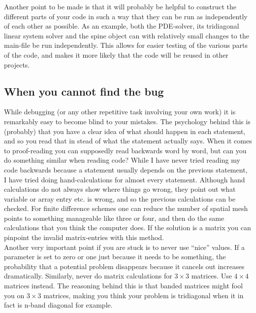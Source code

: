 Another point to be made is that it will probably be helpful to construct the different parts of your code in such a way that they can be run as independently of each other as possible. 
As an example, both the PDE-solver, its tridiagonal linear system solver and the spine object can with relatively small changes to the main-file be run independently. 
This allows for easier testing of the various parts of the code, and makes it more likely that the code will be reused in other projects.

\subsection{When you cannot find the bug}

While debugging (or any other repetitive task involving your own work) it is remarkably easy to become blind to your mistakes. 
The psychology behind this is (probably) that you have a clear idea of what should happen in each statement, and so you read that in stead of what the statement actually says. 
When it comes to proof-reading you can supposedly read backwards word by word, but can you do something similar when reading code? 
While I have never tried reading my code backwards because a statement usually depends on the previous statement, I have tried doing hand-calculations for almost every statement. 
Although hand calculations do not always show where things go wrong, they point out what variable or array entry etc. is wrong, and so the previous calculations can be checked. 
For finite difference schemes one can reduce the number of spatial mesh points to something manageable like three or four, and then do the same calculations that you think the computer does. If the solution is a matrix you can pinpoint the invalid matrix-entries with this method.\\

Another very important point if you are stuck is to never use ``nice'' values. 
If a parameter is set to zero or one just because it needs to be something, the probability that a potential problem disappears because it cancels out increases dramatically. 
Similarly, never do matrix calculations for $3\times 3$ matrices. Use $4\times4$ matrices instead. The reasoning behind this is that banded matrices might fool you on $3\times 3$ matrices, making you think your problem is tridiagonal when it in fact is n-band diagonal for example.